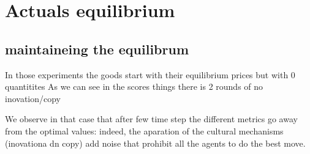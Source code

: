 \documentclass[a4paper]{article}
\begin{document}
	\section{Actuals equilibrium}
	\subsection{maintaineing the equilibrum}

	In those experiments the goods start with their equilibrium prices but with 0 quantitites
	As we can see in the scores things there is 2 rounds of no inovation/copy



	We observe in that case that after few time step the different metrics go away from the optimal values: indeed, the aparation of the cultural mechanisms (inovationa dn copy)  add noise that prohibit all the agents to do the best move. 
\end{document}
